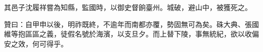 \begin{pinyinscope}
其邑子沈履祥嘗為知縣，監國時，以御史督餉臺州。城破，避山中，被獲死之。

贊曰：自甲申以後，明祚既終，不逾年而南都亦覆，勢固無可為矣。硃大典、張國維等抱區區之義，徒假名號於海濱，以支旦夕。而上替下陵，事無統紀，欲以收偏安之效，何可得乎。


\end{pinyinscope}